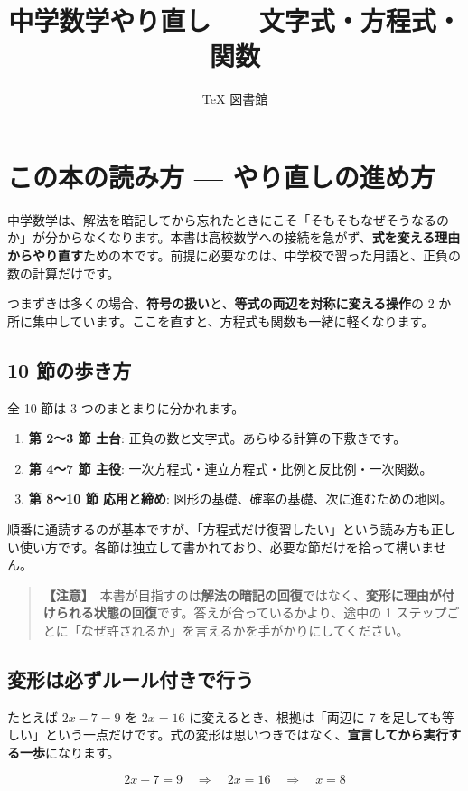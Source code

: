 \documentclass{article}
\title{中学数学やり直し — 文字式・方程式・関数}
\author{TeX 図書館}
\begin{document}
\section{この本の読み方 — やり直しの進め方}

中学数学は、解法を暗記してから忘れたときにこそ「そもそもなぜそうなるのか」が分からなくなります。本書は高校数学への接続を急がず、\textbf{式を変える理由からやり直す}ための本です。前提に必要なのは、中学校で習った用語と、正負の数の計算だけです。

つまずきは多くの場合、\textbf{符号の扱い}と、\textbf{等式の両辺を対称に変える操作}の 2 か所に集中しています。ここを直すと、方程式も関数も一緒に軽くなります。

\subsection{10 節の歩き方}

全 10 節は 3 つのまとまりに分かれます。

\begin{enumerate}
\item \textbf{第 2〜3 節 土台}: 正負の数と文字式。あらゆる計算の下敷きです。
\item \textbf{第 4〜7 節 主役}: 一次方程式・連立方程式・比例と反比例・一次関数。
\item \textbf{第 8〜10 節 応用と締め}: 図形の基礎、確率の基礎、次に進むための地図。
\end{enumerate}

順番に通読するのが基本ですが、「方程式だけ復習したい」という読み方も正しい使い方です。各節は独立して書かれており、必要な節だけを拾って構いません。

\begin{quote}
\textbf{【注意】}\ 本書が目指すのは\textbf{解法の暗記の回復}ではなく、\textbf{変形に理由が付けられる状態の回復}です。答えが合っているかより、途中の 1 ステップごとに「なぜ許されるか」を言えるかを手がかりにしてください。
\end{quote}

\subsection{変形は必ずルール付きで行う}

たとえば \(2x - 7 = 9\) を \(2x = 16\) に変えるとき、根拠は「両辺に 7 を足しても等しい」という一点だけです。式の変形は思いつきではなく、\textbf{宣言してから実行する一歩}になります。

\[ 2x - 7 = 9 \quad \Rightarrow \quad 2x = 16 \quad \Rightarrow \quad x = 8 \]
\end{document}
